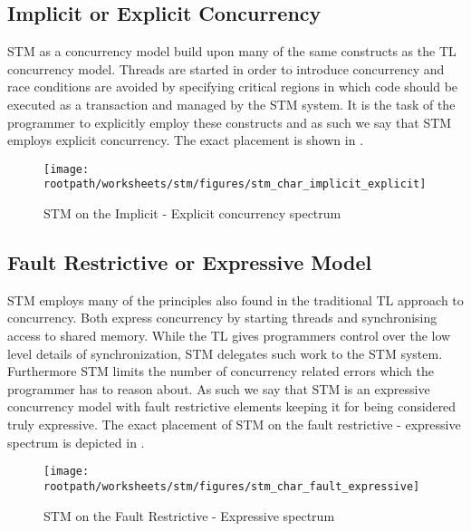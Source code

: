 \subsection{Implicit or Explicit Concurrency}
\ac{STM} as a concurrency model build upon many of the same constructs as the \ac{TL} concurrency model. Threads are started in order to introduce concurrency and race conditions are avoided by specifying critical regions in which code should be executed as a transaction and managed by the \ac{STM} system. It is the task of the programmer to explicitly employ these constructs and as such we say that \ac{STM} employs explicit concurrency. The exact placement is shown in .

\begin{figure}[htbp]
\centering
 \texttt{[image: \\rootpath/worksheets/stm/figures/stm\_char\_implicit\_explicit]} 
 \caption{\ac{STM} on the Implicit - Explicit concurrency spectrum}
\label{fig:stm_char_impli_expli}
\end{figure}

\subsection{Fault Restrictive or Expressive Model}
\ac{STM} employs many of the principles also found in the traditional \ac{TL} approach to concurrency. Both express concurrency by starting threads and synchronising access to shared memory. While the \ac{TL} gives programmers control over the low level details of synchronization, \ac{STM} delegates such work to the \ac{STM} system. Furthermore \ac{STM} limits the number of concurrency related errors which the programmer has to reason about. As such we say that \ac{STM} is an expressive concurrency model with fault restrictive elements keeping it for being considered truly expressive. The exact placement of \ac{STM} on the fault restrictive - expressive spectrum is depicted in .

\begin{figure}[htbp]
\centering
 \texttt{[image: \\rootpath/worksheets/stm/figures/stm\_char\_fault\_expressive]} 
 \caption{\ac{STM} on the Fault Restrictive - Expressive spectrum}
\label{fig:stm_char_fault_expressive}
\end{figure}


